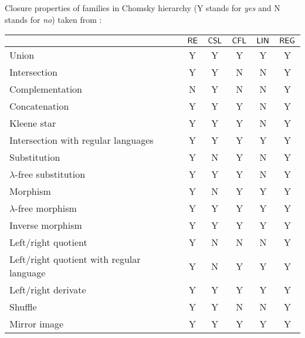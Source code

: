 Closure properties of families in Chomsky hierarchy 
(Y stands for \emph{yes} and N stands for \emph{no}) taken from \cite{MaSa1997formal}:

\begin{center}
\begin{tabular}{ | l | c | c | c | c | c | }
\hline
              & \index{$\RE$}$\RE$
              & \index{$\CSL$}$\CSL$
              & \index{$\CFL$}$\CFL$ 
              & \index{$\Lin$}$\Lin$ 
              & \index{$\Reg$}$\Reg$\\
\hline
\index{union}Union
              & Y     & Y      & Y      & Y      & Y \\
\hline
\index{intersection}Intersection
              & Y     & Y      & N      & N      & Y \\
\hline
\index{complementation}Complementation
              & N     & Y      & N      & N      & Y \\
\hline
\index{concatenation}Concatenation
              & Y     & Y      & Y      & N      & Y \\
\hline
\index{Kleene star}Kleene star
              & Y     & Y      & Y      & N      & Y \\
\hline
\index{intersection!with regular language}Intersection with regular languages
              & Y     & Y      & Y      & Y      & Y \\
\hline
\index{substitution}Substitution
              & Y     & N      & Y      & N      & Y \\
\hline
\index{substitution!$\lambda$-free}$\lambda$-free substitution  
              & Y     & Y      & Y      & N      & Y \\
\hline
\index{morphism}Morphism
              & Y     & N      & Y      & Y      & Y \\
\hline
\index{morphism!$\lambda$-free}$\lambda$-free morphism
              & Y     & Y      & Y      & Y      & Y \\
\hline
\index{morphism!inverse}Inverse morphism
              & Y     & Y      & Y      & Y      & Y \\
\hline
\index{left-quotient}\index{right-quotient}Left/right quotient
              & Y     & N      & N      & N      & Y \\
\hline
\index{left-quotient!with regular language}\index{right-quotient!with regular 
language}Left/right quotient with regular language
              & Y     & N      & Y      & Y      & Y \\
\hline
\index{left-derivate}\index{right-derivate}Left/right derivate
              & Y     & Y      & Y      & Y      & Y \\
\hline
\index{shuffle}Shuffle
              & Y     & Y      & N      & N      & Y \\
\hline
\index{mirror image}Mirror image
              & Y     & Y      & Y      & Y      & Y \\
\hline
\end{tabular}
\end{center}

